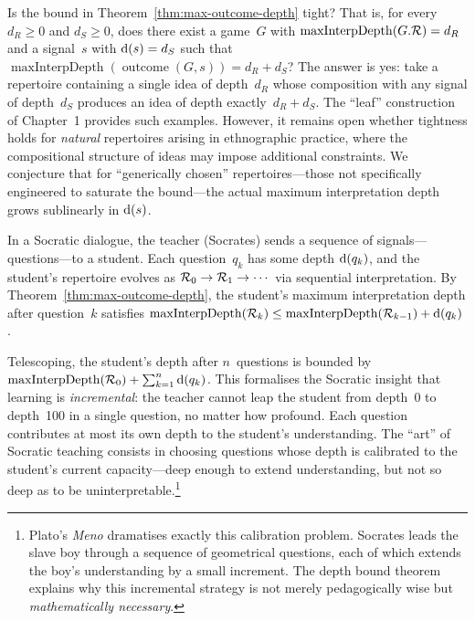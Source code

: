 \begin{remark}
\label{rem:tight-bounds}
Is the bound in Theorem~\ref{thm:max-outcome-depth} tight?  That is,
for every $d_R \geq 0$ and $d_S \geq 0$, does there exist a game~$G$
with $\operatorname{maxInterpDepth}(G.\mathcal{R}) = d_R$ and a signal~$s$ with
$\operatorname{d}(s) = d_S$ such that
$\operatorname{maxInterpDepth}(\operatorname{outcome}(G,s)) = d_R + d_S$?
The answer is yes: take a repertoire containing a single idea of
depth~$d_R$ whose composition with any signal of depth~$d_S$ produces an
idea of depth exactly~$d_R + d_S$.  The ``leaf'' construction of
Chapter~1 provides such examples.  However, it remains open whether
tightness holds for \emph{natural} repertoires arising in ethnographic
practice, where the compositional structure of ideas may impose
additional constraints.  We conjecture that for ``generically chosen''
repertoires---those not specifically engineered to saturate the
bound---the actual maximum interpretation depth grows
sublinearly in $\operatorname{d}(s)$.
\end{remark}

\begin{example}
\label{ex:socratic}
In a Socratic dialogue, the teacher (Socrates) sends a sequence of
signals---questions---to a student.  Each question~$q_k$ has some
depth $\operatorname{d}(q_k)$, and the student's repertoire evolves as
$\mathcal{R}_0 \to \mathcal{R}_1 \to \cdots$ via sequential interpretation.  By
Theorem~\ref{thm:max-outcome-depth}, the student's maximum
interpretation depth after question~$k$ satisfies
$\operatorname{maxInterpDepth}(\mathcal{R}_k) \leq
\operatorname{maxInterpDepth}(\mathcal{R}_{k-1}) + \operatorname{d}(q_k)$.

Telescoping, the student's depth after $n$~questions is bounded by
$\operatorname{maxInterpDepth}(\mathcal{R}_0) + \sum_{k=1}^{n} \operatorname{d}(q_k)$.
This formalises the Socratic insight that learning is \emph{incremental}:
the teacher cannot leap the student from depth~0 to depth~100 in a
single question, no matter how profound.  Each question contributes at
most its own depth to the student's understanding.  The ``art'' of
Socratic teaching consists in choosing questions whose depth is
calibrated to the student's current capacity---deep enough to extend
understanding, but not so deep as to be uninterpretable.\footnote{Plato's
\emph{Meno} dramatises exactly this calibration problem.  Socrates leads
the slave boy through a sequence of geometrical questions, each of which
extends the boy's understanding by a small increment.  The depth bound
theorem explains why this incremental strategy is not merely pedagogically
wise but \emph{mathematically necessary}.}
\end{example}

